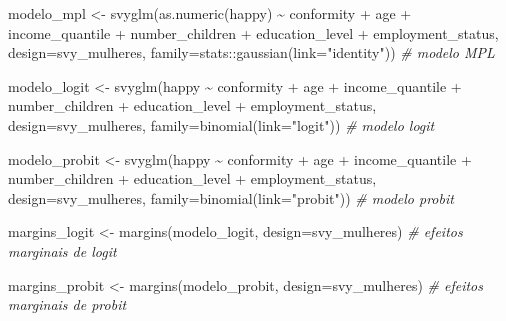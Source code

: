 \documentclass[
]{article}
\newenvironment{Shaded}{\begin{snugshade}}{\end{snugshade}}
\newcommand{\AttributeTok}[1]{\textcolor[rgb]{0.77,0.63,0.00}{#1}}
\newcommand{\CommentTok}[1]{\textcolor[rgb]{0.56,0.35,0.01}{\textit{#1}}}
\newcommand{\FunctionTok}[1]{\textcolor[rgb]{0.00,0.00,0.00}{#1}}
\newcommand{\NormalTok}[1]{#1}
\newcommand{\OtherTok}[1]{\textcolor[rgb]{0.56,0.35,0.01}{#1}}
\newcommand{\SpecialCharTok}[1]{\textcolor[rgb]{0.00,0.00,0.00}{#1}}
\newcommand{\StringTok}[1]{\textcolor[rgb]{0.31,0.60,0.02}{#1}}
\begin{document}
\begin{Shaded}
\begin{Highlighting}[]
\NormalTok{modelo\_mpl }\OtherTok{\textless{}{-}} \FunctionTok{svyglm}\NormalTok{(}\FunctionTok{as.numeric}\NormalTok{(happy) }\SpecialCharTok{\textasciitilde{}}\NormalTok{ conformity }\SpecialCharTok{+}\NormalTok{ age }\SpecialCharTok{+}\NormalTok{ income\_quantile }\SpecialCharTok{+}\NormalTok{ number\_children }\SpecialCharTok{+} 
\NormalTok{                       education\_level  }\SpecialCharTok{+}\NormalTok{ employment\_status, }
                     \AttributeTok{design=}\NormalTok{svy\_mulheres,}
                     \AttributeTok{family=}\NormalTok{stats}\SpecialCharTok{::}\FunctionTok{gaussian}\NormalTok{(}\AttributeTok{link=}\StringTok{"identity"}\NormalTok{)) }\CommentTok{\# modelo MPL}

\NormalTok{modelo\_logit }\OtherTok{\textless{}{-}} \FunctionTok{svyglm}\NormalTok{(happy }\SpecialCharTok{\textasciitilde{}}\NormalTok{ conformity }\SpecialCharTok{+}\NormalTok{  age }\SpecialCharTok{+}\NormalTok{ income\_quantile }\SpecialCharTok{+}\NormalTok{ number\_children }\SpecialCharTok{+} 
\NormalTok{                         education\_level  }\SpecialCharTok{+}\NormalTok{ employment\_status, }
                     \AttributeTok{design=}\NormalTok{svy\_mulheres,}
                     \AttributeTok{family=}\FunctionTok{binomial}\NormalTok{(}\AttributeTok{link=}\StringTok{"logit"}\NormalTok{)) }\CommentTok{\# modelo logit}

\NormalTok{modelo\_probit }\OtherTok{\textless{}{-}} \FunctionTok{svyglm}\NormalTok{(happy }\SpecialCharTok{\textasciitilde{}}\NormalTok{ conformity }\SpecialCharTok{+}\NormalTok{  age }\SpecialCharTok{+}\NormalTok{ income\_quantile }\SpecialCharTok{+}\NormalTok{ number\_children }\SpecialCharTok{+} 
\NormalTok{                        education\_level  }\SpecialCharTok{+}\NormalTok{ employment\_status, }
                      \AttributeTok{design=}\NormalTok{svy\_mulheres,}
                      \AttributeTok{family=}\FunctionTok{binomial}\NormalTok{(}\AttributeTok{link=}\StringTok{"probit"}\NormalTok{)) }\CommentTok{\# modelo probit}
\end{Highlighting}
\end{Shaded}

\begin{Shaded}
\begin{Highlighting}[]
\NormalTok{margins\_logit }\OtherTok{\textless{}{-}} \FunctionTok{margins}\NormalTok{(modelo\_logit, }\AttributeTok{design=}\NormalTok{svy\_mulheres) }\CommentTok{\# efeitos marginais de logit}

\NormalTok{margins\_probit }\OtherTok{\textless{}{-}} \FunctionTok{margins}\NormalTok{(modelo\_probit, }\AttributeTok{design=}\NormalTok{svy\_mulheres) }\CommentTok{\# efeitos marginais de probit}
\end{Highlighting}
\end{Shaded}
\end{document}
